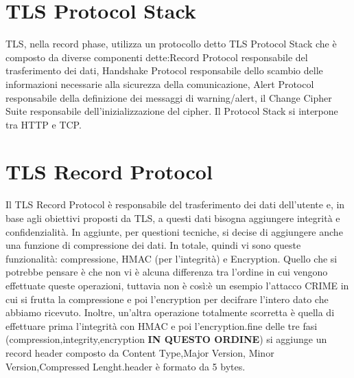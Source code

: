 \documentclass{article}
\begin{document}
\section{TLS Protocol Stack}
TLS, nella record phase, utilizza un protocollo detto TLS Protocol Stack che è composto da diverse componenti dette:\@TLS Record Protocol responsabile del trasferimento dei dati, Handshake Protocol responsabile dello scambio delle informazioni necessarie alla sicurezza della comunicazione, Alert Protocol responsabile della definizione dei messaggi di warning/alert, il Change Cipher Suite responsabile dell'inizializzazione del cipher.
Il Protocol Stack si interpone tra HTTP e TCP\@.
\section{TLS Record Protocol}
Il TLS Record Protocol è responsabile del trasferimento dei dati dell'utente e, in base agli obiettivi proposti da TLS, a questi dati bisogna aggiungere integrità e confidenzialità. In aggiunte, per questioni tecniche, si decise di aggiungere anche una funzione di compressione dei dati. In totale, quindi vi sono queste funzionalità: compressione, HMAC (per l'integrità) e Encryption. Quello che si potrebbe pensare è che non vi è alcuna differenza tra l'ordine in cui vengono effettuate queste operazioni, tuttavia non è così:\@ne è un esempio l'attacco CRIME in cui si frutta la compressione e poi l'encryption per decifrare l'intero dato che abbiamo ricevuto. Inoltre, un'altra operazione totalmente scorretta è quella di effettuare prima l'integrità con HMAC e poi l'encryption.\@Alla fine delle tre fasi (compression,integrity,encryption \textbf{IN QUESTO ORDINE}) si aggiunge un record header composto da Content Type,Major Version, Minor Version,Compressed Lenght.\@Questo header è formato da 5 bytes.
\end{document}
